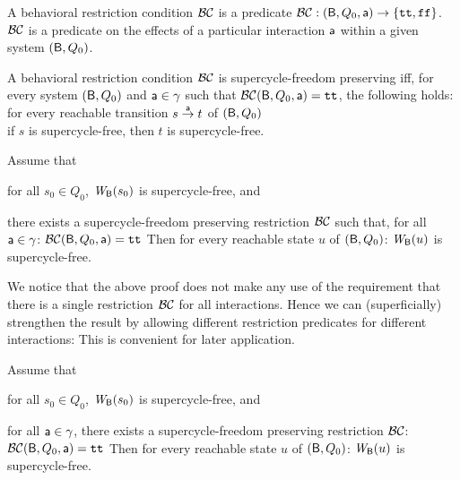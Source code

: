 \bd
A behavioral restriction condition $\BC$ is a predicate $\BC: (\B, Q_0, \act) \to \set{\ttt, \fff}$. 
\ed
$\BC$ is a predicate on the effects of a particular interaction $\act$ within a given system $(\B, Q_0)$.

 \label{def:SC-free-preserving}
A behavioral restriction condition $\BC$ is supercycle-freedom preserving iff, for every system 
$(\B, Q_0)$ and $\act \in \gamma$ such that $\BC(\B, Q_0, \act) = \ttt$, the following holds:\\[2ex]
%
\ind \ind for every reachable transition $s \goesto[\act] t$ of $(\B, Q_0)$\\
\ind \ind \ind if $s$ is supercycle-free, then $t$ is supercycle-free.
\ed


\label{theorem:SC-free-preserving.deadlock-free}
Assume that
\bn
\item \label{theorem:SC-free-preserving.initial}
      for all $s_0 \in Q_0$, $\wfg{\B}{s_0}$ is supercycle-free, and
\item \label{theorem:SC-free-preserving.reachable-transitions}
   there exists a supercycle-freedom preserving restriction $\BC$ such that,
   for all $\act \in \gamma$: $\BC(\B, Q_0, \act) = \ttt$ 
\en
Then for every reachable state $u$ of $(\B, Q_0)$:  $\wfg{\B}{u}$ is supercycle-free.
\et
{}

We notice that the above proof does not make any use of the requirement that there is a single restriction $\BC$ for all
interactions. Hence we can (superficially) strengthen the result by allowing different restriction predicates for different interactions:
This is convenient for later application. 



\label{cor:SC-free-preserving.deadlock-free}
Assume that
\bn
\item \label{cor:SC-free-preserving.initial}
      for all $s_0 \in Q_0$, $\wfg{\B}{s_0}$ is supercycle-free, and
\item \label{cor:SC-free-preserving.reachable-transitions}
   for all $\act \in \gamma$, there exists a supercycle-freedom preserving restriction $\BC$: $\BC(\B, Q_0, \act) = \ttt$ 
\en
Then for every reachable state $u$ of $(\B, Q_0)$:  $\wfg{\B}{u}$ is supercycle-free.
\eco
{}
